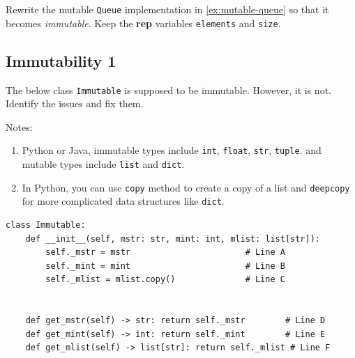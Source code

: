 \documentclass[oneside,11pt,dvipsnames]{book}
\newcommand{\sol}[1]{\iftoggle{usesol}{\textbf{Sol:} #1}{}}
\newcommand{\code}[1]{\texttt{#1}}
\begin{document}
Rewrite the mutable \code{Queue} implementation in \autoref{ex:mutable-queue} so that it becomes \emph{immutable}. Keep the \textbf{rep} variables \code{elements} and \code{size}.




\subsection{Immutability 1}\label{exercise:immutability1}

The below class \code{Immutable} is supposed to be immutable. However, it is not. Identify the issues and fix them.  


Notes:
\begin{enumerate}
\item Python or Java, immutable types include \code{int}, \code{float}, \code{str}, \code{tuple}. and mutable types include \code{list} and \code{dict}. 
\item In Python, you can use \code{copy} method to create a copy of a list and \code{deepcopy} for more complicated data structures like \code{dict}.
\end{enumerate}    

\begin{lstlisting}
class Immutable:
    def __init__(self, mstr: str, mint: int, mlist: list[str]):
        self._mstr = mstr                       # Line A
        self._mint = mint                       # Line B
        self._mlist = mlist.copy()              # Line C

    
    def get_mstr(self) -> str: return self._mstr        # Line D
    def get_mint(self) -> int: return self._mint        # Line E
    def get_mlist(self) -> list[str]: return self._mlist # Line F
\end{lstlisting}
\end{document}
